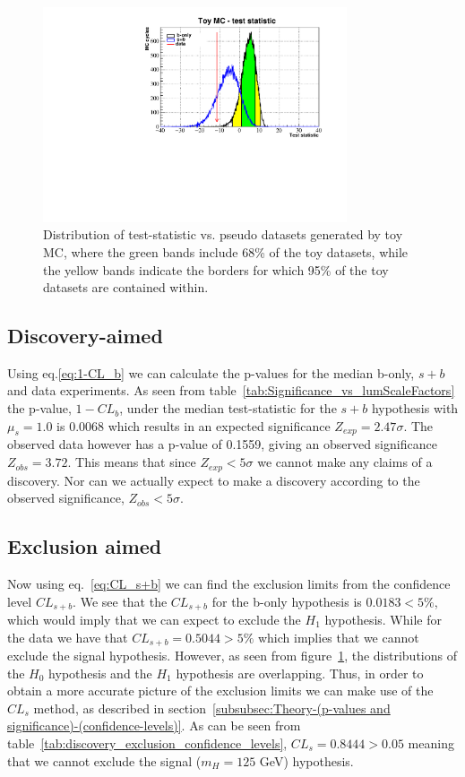 \documentclass[12pt,a4paper]{amsart}
\begin{document}
\begin{figure}
\centering
\includegraphics[width=0.8\textwidth]{../data/11_3/test_statistic_distribution.pdf}
\caption{Distribution of test-statistic vs. pseudo datasets generated by toy MC, where the green bands include 68\% of the toy datasets, while the yellow bands indicate the borders for which 95\% of the toy datasets are contained within.}
\label{fig:toyMC_test_statistic}
\end{figure}


\subsection{Discovery-aimed} \label{subsec:Analysis-(dicovery aimed)}
Using eq.\eqref{eq:1-CL_b} we can calculate the p-values for the median b-only, $s+b$ and data experiments.
As seen from table~\ref{tab:Significance_vs_lumScaleFactors} the p-value, $1-CL_b$, under the median test-statistic for the $s+b$ hypothesis with $\mu_s = 1.0$ is 0.0068 which results in an expected significance $Z_{exp} = 2.47\sigma$. The observed data however has a p-value of 0.1559, giving an observed significance $Z_{obs} = 3.72$. This means that since $Z_{exp} < 5\sigma$ we cannot make any claims of a discovery. Nor can we actually expect to make a discovery according to the observed significance, $Z_{obs} < 5\sigma$.

\subsection{Exclusion aimed} \label{subsec:Analysis-(exclusion aimed)}
Now using eq.~\eqref{eq:CL_s+b} we can find the exclusion limits from the confidence level $CL_{s+b}$. We see that the $CL_{s+b}$ for the b-only hypothesis is $0.0183 < 5\%$, which would imply that we can expect to exclude the $H_1$ hypothesis. While for the data we have that $CL_{s+b} = 0.5044 > 5\%$ which implies that we cannot exclude the signal hypothesis. However, as seen from figure~\ref{fig:toyMC_test_statistic}, the distributions of the $H_0$ hypothesis and the $H_1$ hypothesis are overlapping. Thus, in order to obtain a more accurate picture of the exclusion limits we can make use of the $CL_s$ method, as described in section~\ref{subsubsec:Theory-(p-values and significance)-(confidence-levels)}. As can be seen from table~\ref{tab:discovery_exclusion_confidence_levels}, $CL_s = 0.8444 > 0.05$ meaning that we cannot exclude the signal ($m_H = 125$ GeV) hypothesis.
\end{document}
